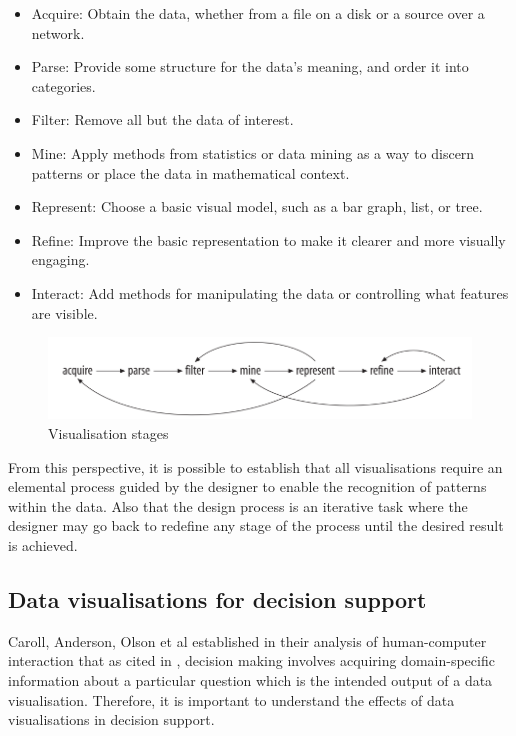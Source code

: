 \begin{displayquote}
	\begin{itemize}
\item Acquire: Obtain the data, whether from a file on a disk or a source over a network. 
\item Parse: Provide some structure for the data’s meaning, and order it into categories. 
\item Filter: Remove all but the data of interest. 
\item Mine: Apply methods from statistics or data mining as a way to discern patterns or place the data in mathematical context.
\item Represent: Choose a basic visual model, such as a bar graph, list, or tree. 
\item Refine: Improve the basic representation to make it clearer and more visually engaging. 
\item Interact: Add methods for manipulating the data or controlling what features are visible.
\end{itemize}
\end{displayquote}

\begin{figure}[!htb]
\begin{adjustbox}{width=1\textwidth,center=\textwidth}
  \centering
  \includegraphics[scale=1]{images/visualization_stages.png}
\end{adjustbox}
  \caption[Visualisation stages]{Visualisation stages  \cite{Cleveland1993} }
  \label{fig:data_visualization_stages}
\end{figure}
From this perspective, it is possible to establish that all visualisations require an elemental process guided by the designer to enable the recognition of patterns within the data. Also that the design process is an iterative task where the designer may go back to redefine any stage of the process until the desired result is achieved. 

\subsection{Data visualisations for decision support}
Caroll, Anderson, Olson et al established in their analysis of human-computer interaction that
 \cite{carroll1987mental} as cited in \cite{Zhu2008}, decision making involves acquiring domain-specific information about a particular question which is the intended output of a data visualisation. Therefore, it is important to understand the effects of data visualisations in decision support.

